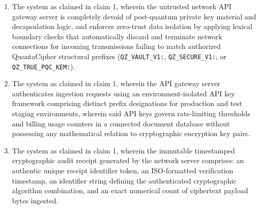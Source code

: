 \documentclass[12pt, a4paper]{article}
\begin{document}
\begin{enumerate}
    \item The system as claimed in claim 1, wherein the untrusted network API gateway server is completely devoid of post-quantum private key material and decapsulation logic, and enforces zero-trust data isolation by applying lexical boundary checks that automatically discard and terminate network connections for incoming transmissions failing to match authorized QuantaCipher structural prefixes (\texttt{QZ\_VAULT\_V1:}, \texttt{QZ\_SECURE\_V1:}, or \texttt{QZ\_TRUE\_PQC\_KEM:}).
    
    \item The system as claimed in claim 1, wherein the API gateway server authenticates ingestion requests using an environment-isolated API key framework comprising distinct prefix designations for production and test staging environments, wherein said API keys govern rate-limiting thresholds and billing usage counters in a connected document database without possessing any mathematical relation to cryptographic encryption key pairs.
    
    \item The system as claimed in claim 1, wherein the immutable timestamped cryptographic audit receipt generated by the network server comprises: an authentic unique receipt identifier token, an ISO-formatted verification timestamp, an identifier string defining the authenticated cryptographic algorithm combination, and an exact numerical count of ciphertext payload bytes ingested.
    

\end{enumerate}
\end{document}
